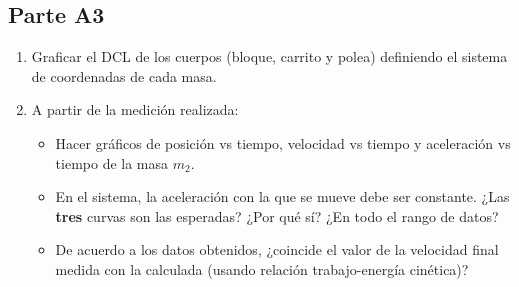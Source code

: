 \subsection{Parte A3}%
\label{sub:cues_parte_a3}

\begin{enumerate}
	\item Graficar el DCL de los cuerpos
		(bloque, carrito y polea)
		definiendo el sistema de coordenadas de cada masa.
	\item A partir de la medición realizada:
		\begin{itemize}
			\item Hacer gráficos de posición vs tiempo,
				velocidad vs tiempo y
				aceleración vs tiempo de la masa $m_2$.
			\item En el sistema,
				la aceleración con la que se mueve debe ser constante.
				¿Las \textbf{tres} curvas son las esperadas?
				¿Por qué sí?
				¿En todo el rango de datos?
			\item De acuerdo a los datos obtenidos,
				¿coincide el valor de la velocidad final medida con la calculada
				(usando relación trabajo-energía cinética)?
		\end{itemize}
\end{enumerate}
